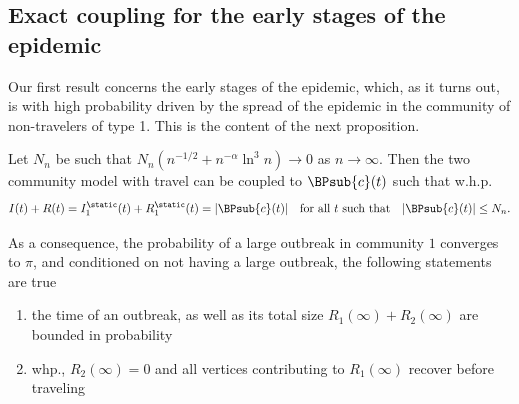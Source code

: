 \documentclass[11pt]{article}
\begin{document}
\subsection{Exact coupling for the early stages of the epidemic}


Our first result concerns the early stages of the epidemic, which, as it turns out, is with high probability driven by the spread of the epidemic in 
the community of non-travelers of type 1.  This is the content of the next proposition.

\begin{proposition}\label{pro:small-time-coupling}
Let $N_n$ be such that $N_n(n^{-1/2}+n^{-\alpha}\ln^3 n)\to 0$ as $n\to\infty$.
 Then the two community model with travel can be coupled to $\BPsub{c}(t)$ such that
 w.h.p.
 \begin{equation}\label{eq:size_of_tree_coupling}
     I(t)+R(t)=I_1^{\static}(t)+R_1^{\static}(t)=|\BPsub{c}(t)| \quad\text{for all $t$ such that} \quad|\BPsub{c}(t)| \leq N_n.
 \end{equation}

   As a consequence, the probability of a large outbreak in community $1$ converges to $\pi$, and conditioned on not having a large outbreak, the following statements are true
    \begin{enumerate}
        \item the time of an outbreak, as well as its total size $R_1(\infty)+R_2(\infty)$ are bounded in probability
        \item whp., $R_2(\infty)=0$ and all vertices contributing to $R_1(\infty)$ recover before traveling
    \end{enumerate}
\end{proposition}
\end{document}
